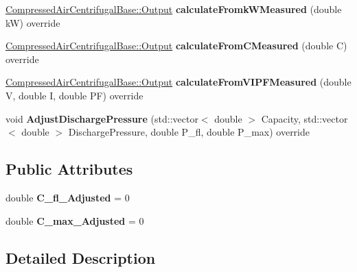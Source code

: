 \begin{DoxyCompactItemize}
\hyperlink{struct_compressed_air_centrifugal_base_1_1_output}{Compressed\+Air\+Centrifugal\+Base\+::\+Output} {\bfseries calculate\+Fromk\+W\+Measured} (double kW) override
\item 
\mbox{\label{class_compressed_air_centrifugal___modulation_unload_a2e49637b29a1d29d9d8a125799507858}} 
\hyperlink{struct_compressed_air_centrifugal_base_1_1_output}{Compressed\+Air\+Centrifugal\+Base\+::\+Output} {\bfseries calculate\+From\+C\+Measured} (double C) override
\item 
\mbox{\label{class_compressed_air_centrifugal___modulation_unload_a018311cd6ce4ae873dcff461b31f73e7}} 
\hyperlink{struct_compressed_air_centrifugal_base_1_1_output}{Compressed\+Air\+Centrifugal\+Base\+::\+Output} {\bfseries calculate\+From\+V\+I\+P\+F\+Measured} (double V, double I, double PF) override
\item 
\mbox{\label{class_compressed_air_centrifugal___modulation_unload_adbfdbf6e38b380add5012b94aa981ac7}} 
void {\bfseries Adjust\+Discharge\+Pressure} (std\+::vector$<$ double $>$ Capacity, std\+::vector$<$ double $>$ Discharge\+Pressure, double P\+\_\+fl, double P\+\_\+max) override
\end{DoxyCompactItemize}
\subsection*{Public Attributes}
\begin{DoxyCompactItemize}
\item 
\mbox{\label{class_compressed_air_centrifugal___modulation_unload_a40777eb949172fb7ae614215f8a50aae}} 
double {\bfseries C\+\_\+fl\+\_\+\+Adjusted} = 0
\item 
\mbox{\label{class_compressed_air_centrifugal___modulation_unload_afdb8ebc6323a8c912d3ae0d5c6141af3}} 
double {\bfseries C\+\_\+max\+\_\+\+Adjusted} = 0
\end{DoxyCompactItemize}


\subsection{Detailed Description}


